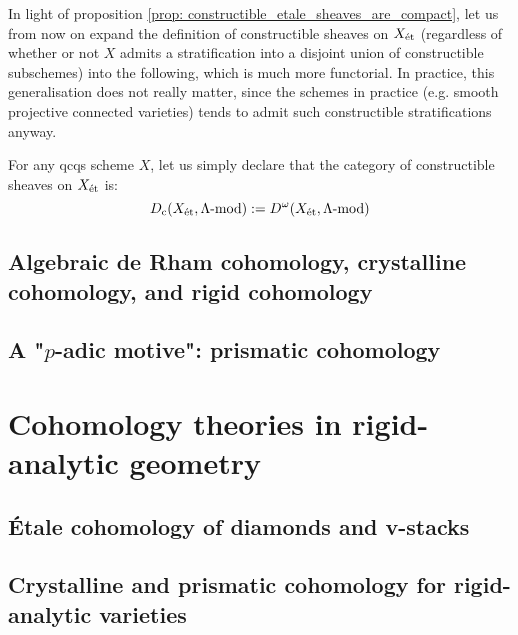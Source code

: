             In light of proposition \ref{prop: constructible_etale_sheaves_are_compact}, let us from now on expand the definition of constructible sheaves on $X_{\mathrm{\acute{e}t}}$ (regardless of whether or not $X$ admits a stratification into a disjoint union of constructible subschemes) into the following, which is much more functorial. In practice, this generalisation does not really matter, since the schemes in practice (e.g. smooth projective connected varieties) tends to admit such constructible stratifications anyway.
            \begin{definition} \label{def: constructible_etale_sheaves}
                For any qcqs scheme $X$, let us simply declare that the category of constructible sheaves on $X_{\mathrm{\acute{e}t}}$ is:
                    $$D_{\mathrm{c}}(X_{\mathrm{\acute{e}t}}, \Lambda\text{-}\mathrm{mod}) := D^{\omega}(X_{\mathrm{\acute{e}t}}, \Lambda\text{-}\mathrm{mod})$$
            \end{definition}
            \begin{lemma}
                
            \end{lemma}

        \subsection{Algebraic de Rham cohomology, crystalline cohomology, and rigid cohomology}

        \subsection{\texorpdfstring{A "$p$-adic motive"}{}: prismatic cohomology}

    \section{Cohomology theories in rigid-analytic geometry}
        \subsection{\'Etale cohomology of diamonds and v-stacks}

        \subsection{Crystalline and prismatic cohomology for rigid-analytic varieties}
    
    \printbibliography

